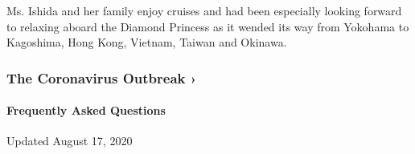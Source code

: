 Ms. Ishida and her family enjoy cruises and had been especially looking
forward to relaxing aboard the Diamond Princess as it wended its way
from Yokohama to Kagoshima, Hong Kong, Vietnam, Taiwan and Okinawa.

\href{https://www.nytimes3xbfgragh.onion/news-event/coronavirus?action=click\&pgtype=Article\&state=default\&region=MAIN_CONTENT_3\&context=storylines_faq}{}

\hypertarget{the-coronavirus-outbreak-}{%
\subsubsection{The Coronavirus Outbreak
›}\label{the-coronavirus-outbreak-}}

\hypertarget{frequently-asked-questions}{%
\paragraph{Frequently Asked
Questions}\label{frequently-asked-questions}}

Updated August 17, 2020

